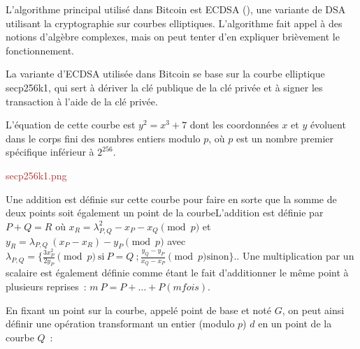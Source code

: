 L'algorithme principal utilisé dans Bitcoin est ECDSA (), une variante de DSA utilisant la cryptographie sur courbes elliptiques. L'algorithme fait appel à des notions d'algèbre complexes, mais on peut tenter d'en expliquer brièvement le fonctionnement.

La variante d'ECDSA utilisée dans Bitcoin se base sur la courbe elliptique secp256k1, qui sert à dériver la clé publique de la clé privée et à signer les transaction à l'aide de la clé privée.

L'équation de cette courbe est $y^2 = x^3 + 7$ dont les coordonnées $x$ et $y$ évoluent dans le corps fini des nombres entiers modulo $p$, où $p$ est un nombre premier spécifique inférieur à $2^{256}$.

\textcolor{brown}{secp256k1.png}

Une addition est définie sur cette courbe pour faire en sorte que la somme de deux points soit également un point de la courbe{L'addition est définie par $P + Q = R$ où $x_R = \lambda_{P,Q}^2 - x_P - x_Q \pmod p$ et $y_R = \lambda_{P,Q}~( x_P - x_R ) - y_P \pmod p$ avec $\lambda_{P,Q} = \{ \frac{3 x_P^2}{2 y_P} \pmod p~\mathrm{si}~P = Q~;  \frac{y_Q - y_P}{x_Q - x_P} \pmod p \mathrm{sinon} \}$.}. Une multiplication par un scalaire est également définie comme étant le fait d'additionner le même point à plusieurs reprises~: $m~P = P + \ldots + P (m fois)$.

En fixant un point sur la courbe, appelé point de base et noté $G$, on peut ainsi définir une opération transformant un entier (modulo $p$) $d$ en un point de la courbe $Q$~:

